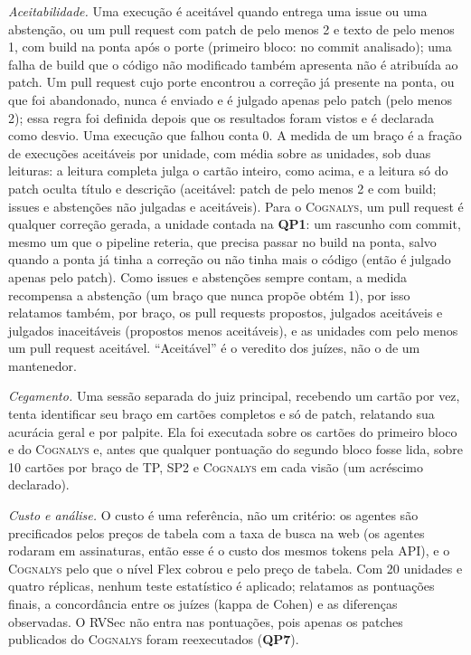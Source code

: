 \documentclass[conference]{IEEEtran}
\newcommand{\system}{\textsc{Cognalys}}
\newcommand{\researchq}[1]{\textbf{QP#1}}
\begin{document}
\emph{Aceitabilidade.} Uma execução é aceitável quando entrega uma issue ou uma
abstenção, ou um pull request com patch de pelo menos 2 e texto de pelo menos 1,
com build na ponta após o porte (primeiro bloco: no commit analisado); uma
falha de build que o código não modificado também apresenta não é atribuída ao patch. Um pull
request cujo porte encontrou a correção já presente na ponta, ou que foi abandonado, nunca
é enviado e é julgado apenas pelo patch (pelo menos 2); essa regra foi definida
depois que os resultados foram vistos e é declarada como desvio.
Uma execução que falhou conta 0. A medida de um braço é a fração de execuções aceitáveis por
unidade, com média sobre as unidades, sob duas leituras: a leitura completa julga o
cartão inteiro, como acima, e a leitura só do patch oculta título e descrição
(aceitável: patch de pelo menos 2 e com build; issues e abstenções não julgadas e
aceitáveis). Para o {\system}, um pull request é qualquer correção gerada, a unidade contada
na \researchq{1}: um rascunho com commit, mesmo um que o pipeline reteria, que
precisa passar no build na ponta, salvo quando a ponta já tinha a correção ou
não tinha mais o código (então é julgado apenas pelo patch). Como issues e abstenções sempre
contam, a medida recompensa a abstenção (um braço que nunca propõe obtém 1),
por isso relatamos também, por braço, os pull requests propostos, julgados aceitáveis e
julgados inaceitáveis (propostos menos aceitáveis), e as unidades com pelo menos um
pull request aceitável. ``Aceitável'' é o veredito dos juízes, não o de um
mantenedor.

\emph{Cegamento.} Uma sessão separada do juiz principal, recebendo um cartão por
vez, tenta identificar seu braço em cartões completos e só de patch, relatando sua
acurácia geral e por palpite. Ela foi executada sobre os cartões do primeiro bloco e do {\system}
e, antes que qualquer pontuação do segundo bloco fosse lida, sobre 10
cartões por braço de TP, SP2 e {\system} em cada visão (um acréscimo declarado).

\emph{Custo e análise.} O custo é uma referência, não um critério: os agentes são
precificados pelos preços de tabela com a taxa de busca na web (os agentes rodaram em assinaturas,
então esse é o custo dos mesmos tokens pela API), e o {\system} pelo que o
nível Flex cobrou e pelo preço de tabela. Com 20 unidades e quatro réplicas, nenhum
teste estatístico é aplicado; relatamos as pontuações finais, a concordância entre os juízes
(kappa de Cohen) e as diferenças observadas. O RVSec não entra nas pontuações, pois apenas
os patches publicados do {\system} foram reexecutados (\researchq{7}).
\end{document}
